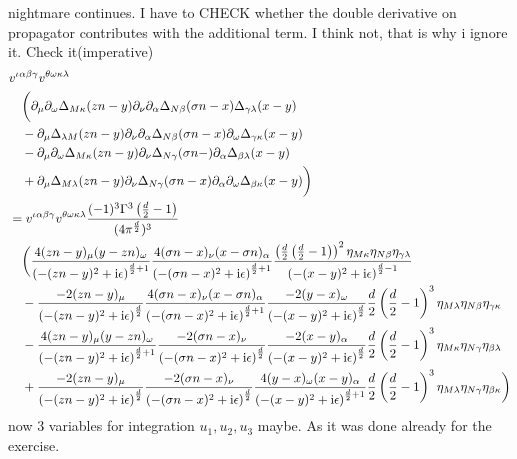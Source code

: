nightmare continues.
I have to CHECK whether the double derivative on propagator contributes with the additional term. I think not, that is why i ignore it. Check it(imperative)
\begin{align}
	&v^{\iota\alpha\beta\gamma}v^{\theta\omega\kappa\lambda}
	\\&~~~ \bigg( \partial_\mu \partial_\omega \Delta_{M\kappa}(zn-y) \partial_\nu \partial_\alpha\Delta_{N\beta}(\sigma n-x)\Delta_{\gamma\lambda}(x-y)
	\\&~~~
	- \partial_\mu \Delta_{\lambda M}(zn-y) \partial_\nu \partial_\alpha\Delta_{N\beta}(\sigma n-x) \partial_\omega\Delta_{\gamma\kappa}(x-y)
	\\&~~~
	-\partial_\mu\partial_\omega \Delta_{M\kappa}(zn-y) \partial_\nu \Delta_{N\gamma}(\sigma n -) \partial_\alpha \Delta_{\beta\lambda}(x-y)
	\\&~~~
	+\partial_\mu \Delta_{M\lambda}(zn-y)\partial_\nu\Delta_{N\gamma}(\sigma n -x) \partial_\alpha\partial_\omega\Delta_{\beta \kappa} (x-y) \bigg)
	\\
	&=
	v^{\iota\alpha\beta\gamma}v^{\theta\omega\kappa\lambda}\frac{(-1)^3\Gamma^3\left(\frac{d}{2}-1\right)}{(4\pi^{\frac{d}{2}})^3}
	\\&~~~ \bigg(\frac{4(zn-y)_\mu(y-zn)_\omega}{\left(-(zn-y)^2+\text{i} \epsilon\right)^{\frac{d}{2}+1}}\frac{4(\sigma n-x)_\nu(x-\sigma n)_\alpha}{\left(-(\sigma n-x)^2+\text{i} \epsilon\right)^{\frac{d}{2}+1}} \frac{\left(\frac{d}{2}\left(\frac{d}{2}-1\right)\right)^2\eta_{M\kappa}\eta_{N\beta}\eta_{\gamma\lambda}}{\left(-(x-y)^2+\text{i} \epsilon\right)^{\frac{d}{2}-1}}
	\\&~~~
	- \frac{-2(zn-y)_\mu}{\left(-(zn-y)^2+\text{i} \epsilon\right)^{\frac{d}{2}}}\frac{4(\sigma n-x)_\nu(x-\sigma n)_\alpha}{\left(-(\sigma n-x)^2+\text{i} \epsilon\right)^{\frac{d}{2}+1}} \frac{-2(y-x)_\omega}{\left(-(x-y)^2+\text{i} \epsilon\right)^{\frac{d}{2}}}\frac{d}{2}\left(\frac{d}{2}-1\right)^3\eta_{M\lambda}\eta_{N\beta}\eta_{\gamma\kappa}
	\\&~~~
	-\frac{4(zn-y)_\mu(y-zn)_\omega}{\left(-(zn-y)^2+\text{i} \epsilon\right)^{\frac{d}{2}+1}}\frac{-2(\sigma n-x)_\nu}{\left(-(\sigma n-x)^2+\text{i} \epsilon\right)^{\frac{d}{2}}} \frac{-2(x-y)_\alpha}{\left(-(x-y)^2+\text{i} \epsilon\right)^{\frac{d}{2}}}\frac{d}{2}\left(\frac{d}{2}-1\right)^3\eta_{M\kappa}\eta_{N\gamma}\eta_{\beta\lambda}
	\\&~~~
	+\frac{-2(zn-y)_\mu}{\left(-(zn-y)^2+\text{i} \epsilon\right)^{\frac{d}{2}}}\frac{-2(\sigma n-x)_\nu}{\left(-(\sigma n-x)^2+\text{i} \epsilon\right)^{\frac{d}{2}}} \frac{4(y-x)_\omega(x-y)_\alpha}{\left(-(x-y)^2+\text{i} \epsilon\right)^{\frac{d}{2}+1}}\frac{d}{2}\left(\frac{d}{2}-1\right)^3\eta_{M\lambda}\eta_{N\gamma}\eta_{\beta\kappa}\bigg)
\end{align}
now 3 variables for integration $u_1,u_2,u_3$ maybe. As it was done already for the exercise.  
